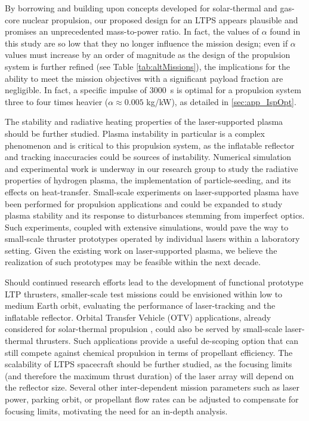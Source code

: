 \documentclass[final,3p,times,twocolumn,sort&compress, lefttitle]{elsarticle}
\newcommand{\rev}[1]{\textcolor{red}{#1}}
\renewcommand{\rev}[1]{#1}  %
\begin{document}
        By borrowing and building upon concepts developed for solar-thermal and gas-core nuclear propulsion, our proposed design for an LTPS appears plausible and promises an unprecedented mass-to-power ratio. In fact, the values of $\alpha$ found in this study are so low that they no longer influence the mission design; even if $\alpha$ values must increase by an order of magnitude as the design of the propulsion system is further refined (see Table \ref{tab:altMissions}), the implications for the ability to meet the mission objectives with a significant payload fraction are negligible. In fact, a specific impulse of 3000~s is optimal for a propulsion system three to four times heavier ($\alpha \approx 0.005$ kg/kW), as detailed in \ref{sec:app_IspOpt}.

        The stability and radiative heating properties of the laser-supported plasma should be further studied. Plasma instability in particular is a complex phenomenon and is critical to this propulsion system, as the inflatable reflector and tracking inaccuracies could be sources of instability. Numerical simulation and experimental work is underway in our research group to study the radiative properties of hydrogen plasma, the implementation of particle-seeding, and its effects on heat-transfer. Small-scale experiments on laser-supported plasma have been performed for propulsion applications \cite{inoue_oscillation_2004} and could be expanded to study plasma stability and its response to disturbances stemming from imperfect optics. \rev{Such experiments, coupled with extensive simulations, would pave the way to small-scale thruster prototypes operated by individual lasers within a laboratory setting. Given the existing work on laser-supported plasma, we believe the realization of such prototypes may be feasible within the next decade.}
        
        Should continued research efforts lead to the development of functional prototype LTP thrusters, smaller-scale test missions could be envisioned within low to medium Earth orbit, evaluating the performance of laser-tracking and the inflatable reflector. \rev{Orbital Transfer Vehicle (OTV) applications, already considered for solar-thermal propulsion \cite{engberg_modal_2000}, could also be served by small-scale laser-thermal thrusters. Such applications provide a useful de-scoping option that can still compete against chemical propulsion in terms of propellant efficiency.} The scalability of LTPS spacecraft should be further studied, as the focusing limits (and therefore the maximum thrust duration) of the laser array will depend on the reflector size. Several other inter-dependent mission parameters such as laser power, parking orbit, or propellant flow rates can be adjusted to compensate for focusing limits, motivating the need for an in-depth analysis.
        
\end{document}

